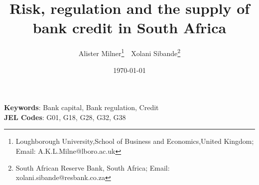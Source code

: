 
\title{Risk, regulation and the supply of bank credit in South Africa}


\author { 
Alister Milner\footnote{Loughborough University,School of Business and Economics,United Kingdom; Email: A.K.L.Milne@lboro.ac.uk}  \,\, 
Xolani Sibande\footnote{South African Reserve Bank, South Africa; Email: xolani.sibande@resbank.co.za}
}
\date{\today}
\maketitle

\begin{abstract}


\end{abstract}

\noindent\textbf{Keywords}: Bank capital, Bank regulation, Credit   \\
\textbf{JEL Codes}: G01, G18, G28, G32, G38
\newpage